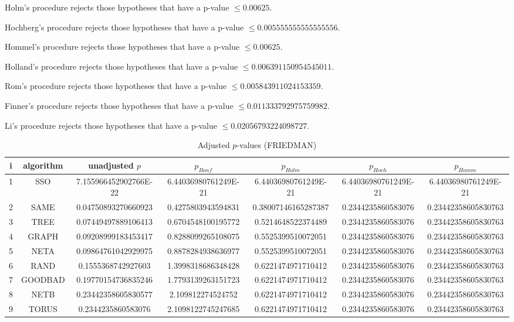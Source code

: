 \documentclass[a4paper,10pt]{article}
\begin{document}
\begin{landscape}
Holm's procedure rejects those hypotheses that have a p-value $\le0.00625$.


Hochberg's procedure rejects those hypotheses that have a p-value $\le0.005555555555555556$.


Hommel's procedure rejects those hypotheses that have a p-value $\le0.00625$.


Holland's procedure rejects those hypotheses that have a p-value $\le0.006391150954545011$.


Rom's procedure rejects those hypotheses that have a p-value $\le0.005843911024153359$.


Finner's procedure rejects those hypotheses that have a p-value $\le0.011333792975759982$.


Li's procedure rejects those hypotheses that have a p-value $\le0.02056793224098727$.



\newpage

\begin{table}[!htp]
\centering\scriptsize
\caption{Adjusted $p$-values (FRIEDMAN)}
\begin{tabular}{ccccccc}
i&algorithm&unadjusted $p$&$p_{Bonf}$&$p_{Holm}$&$p_{Hoch}$&$p_{Homm}$\\
\hline
1& SSO&7.155966452902766E-22&6.44036980761249E-21&6.44036980761249E-21&6.44036980761249E-21&6.44036980761249E-21\\
2& SAME&0.04750893270660923&0.4275803943594831&0.38007146165287387&0.2344235860583076&0.23442358605830763\\
3& TREE&0.07449497889106413&0.6704548100195772&0.5214648522374489&0.2344235860583076&0.23442358605830763\\
4& GRAPH&0.09208999183453417&0.8288099265108075&0.5525399510072051&0.2344235860583076&0.23442358605830763\\
5& NETA&0.09864761042929975&0.8878284938636977&0.5525399510072051&0.2344235860583076&0.23442358605830763\\
6& RAND&0.1555368742927603&1.3998318686348428&0.6221474971710412&0.2344235860583076&0.23442358605830763\\
7& GOODBAD&0.19770154736835246&1.7793139263151723&0.6221474971710412&0.2344235860583076&0.23442358605830763\\
8& NETB&0.23442358605830577&2.109812274524752&0.6221474971710412&0.2344235860583076&0.23442358605830763\\
9& TORUS&0.2344235860583076&2.1098122745247685&0.6221474971710412&0.2344235860583076&0.23442358605830763\\
\hline
\end{tabular}
\end{table}


\end{landscape}
\end{document}

